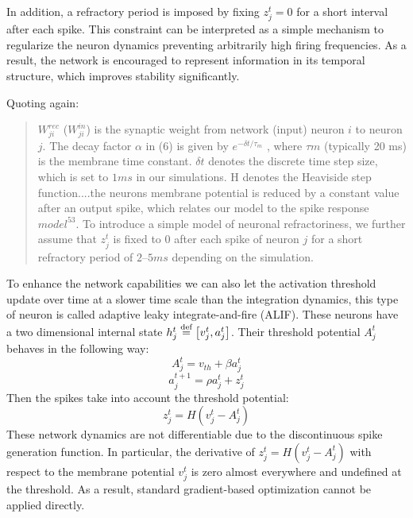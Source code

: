 In addition, a refractory period is imposed by fixing $z^t_j = 0$ for a short interval after each spike. This constraint can be interpreted as a simple mechanism to regularize the neuron dynamics preventing arbitrarily high firing frequencies. As a result, the network is encouraged to represent information in its temporal structure, which improves stability significantly. 

Quoting \cite{eprop2020} again:
\begin{quote}
    $W^{rec}_{ji}$ ($W^{in}_{ji}$) is the synaptic weight from network (input) neuron $i$ to neuron $j$. The decay factor $\alpha$ in (6) is given by $e^{-\delta t/\tau_m}$ , where $\tau m$ (typically 20 ms) is the membrane time constant. $\delta t$ denotes the discrete time step size, which is set to $1 ms$ in our simulations. H denotes the Heaviside step function....the neurons membrane potential is reduced by a constant value after an output spike, which relates our model to the spike response $model^{53}$. To introduce a simple model of neuronal refractoriness, we further assume that $z^t_j$ is fixed to $0$ after each spike of neuron $j$ for a short refractory period of $2–5 ms$ depending on the simulation.
\end{quote}

To enhance the network capabilities we can also let the activation threshold update over time at a slower time scale than the integration dynamics, this type of neuron is called adaptive leaky integrate-and-fire (ALIF). These neurons have a two dimensional internal state $h^t_j \stackrel{\text{def}}{=} \left[ v^t_j, a^t_j\right]$. Their threshold potential $A^t_j$ behaves in the following way:
\begin{equation}
A^t_j = v_{th} + \beta a^t_j
\end{equation}
\begin{equation}
a^{t+1}_j=\rho a^t_j + z^t_j
\end{equation}
Then the spikes take into account the threshold potential:
\begin{equation}
z^t_j=H(v^t_j-A^t_j)
\end{equation}
These network dynamics are not differentiable due to the discontinuous spike generation function. In particular, the derivative of $z^t_j = H(v^t_j - A^t_j)$ with respect to the membrane potential $v^t_j$ is zero almost everywhere and undefined at the threshold. As a result, standard gradient-based optimization cannot be applied directly.


